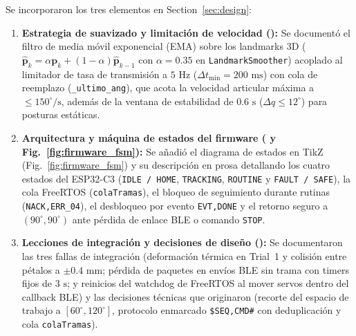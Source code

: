 \documentclass{LabDSTresponse}
\begin{document}
{Se incorporaron los tres elementos en Section~\ref{sec:design}:
\begin{enumerate}
    \item \textbf{Estrategia de suavizado y limitación de velocidad ():} Se documentó el filtro de media móvil exponencial (EMA) sobre los landmarks 3D ($\hat{\mathbf{p}}_k = \alpha \mathbf{p}_k + (1-\alpha)\hat{\mathbf{p}}_{k-1}$ con $\alpha = 0.35$ en \texttt{LandmarkSmoother}) acoplado al limitador de tasa de transmisión a $5\text{ Hz}$ ($\Delta t_{\min} = 200\text{ ms}$) con cola de reemplazo (\texttt{\_ultimo\_ang}), que acota la velocidad articular máxima a $\le 150^\circ/\text{s}$, además de la ventana de estabilidad de $0.6\text{ s}$ ($\Delta q \le 12^\circ$) para posturas estáticas.
    \item \textbf{Arquitectura y máquina de estados del firmware ( y Fig.~\ref{fig:firmware_fsm}):} Se añadió el diagrama de estados en TikZ (Fig.~\ref{fig:firmware_fsm}) y su descripción en prosa detallando los cuatro estados del ESP32-C3 (\texttt{IDLE / HOME}, \texttt{TRACKING}, \texttt{ROUTINE} y \texttt{FAULT / SAFE}), la cola FreeRTOS (\texttt{colaTramas}), el bloqueo de seguimiento durante rutinas (\texttt{NACK,ERR\_04}), el desbloqueo por evento \texttt{EVT,DONE} y el retorno seguro a $(90^\circ, 90^\circ)$ ante pérdida de enlace BLE o comando \texttt{STOP}.
    \item \textbf{Lecciones de integración y decisiones de diseño ():} Se documentaron las tres fallas de integración (deformación térmica en Trial~1 y colisión entre pétalos a $\pm 0.4\text{ mm}$; pérdida de paquetes en envíos BLE sin trama con timers fijos de $3\text{ s}$; y reinicios del watchdog de FreeRTOS al mover servos dentro del callback BLE) y las decisiones técnicas que originaron (recorte del espacio de trabajo a $[60^\circ, 120^\circ]$, protocolo enmarcado \texttt{\$SEQ,CMD\#} con deduplicación y cola \texttt{colaTramas}).
\end{enumerate}}

\end{document}
